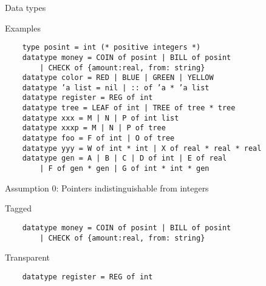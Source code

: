 \documentclass[presentation]{beamer}
\begin{document}
\begin{frame}[fragile]{Data types}
  \begin{block}{Examples}
\begin{verbatim}
    type posint = int (* positive integers *)
    datatype money = COIN of posint | BILL of posint
        | CHECK of {amount:real, from: string}
    datatype color = RED | BLUE | GREEN | YELLOW
    datatype ’a list = nil | :: of ’a * ’a list
    datatype register = REG of int
    datatype tree = LEAF of int | TREE of tree * tree
    datatype xxx = M | N | P of int list
    datatype xxxp = M | N | P of tree
    datatype foo = F of int | O of tree
    datatype yyy = W of int * int | X of real * real * real
    datatype gen = A | B | C | D of int | E of real
        | F of gen * gen | G of int * int * gen
\end{verbatim}
  \end{block}
\end{frame}

\begin{frame}[fragile]{Assumption 0: Pointers indistinguishable from integers}
  \begin{block}{Tagged}
\begin{verbatim}
    datatype money = COIN of posint | BILL of posint
        | CHECK of {amount:real, from: string}
\end{verbatim}
  \end{block}
  \begin{block}{Transparent}
\begin{verbatim}
    datatype register = REG of int
\end{verbatim}
  \end{block}
\end{frame}
\end{document}
